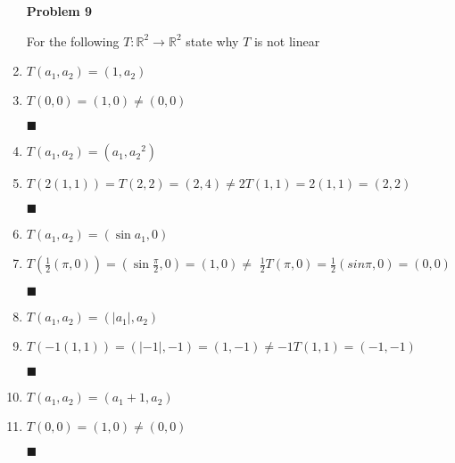 \documentclass[a4paper, 12pt]{report}
\newcommand{\bb}[1]{\mathbb{#1}}
\newcommand{\problem}[2]{
	\begin{enumerate}
		\item[\bf{Problem #1}] 
		#2
	\end{enumerate}
}
\newcommand{\subproof}[3]{
	\item[#1] #2
	\item[\bf{Proof:}]
	#3 
	\begin{flushright}
		$\blacksquare$
	\end{flushright}
}
\begin{document}

\problem{9}{
	For the following $T:\bb{R}^2 \rightarrow \bb{R}^2$ state why $T$ is not linear

	\subproof{(a)}{
		$T(a_1,a_2) = (1,a_2)$	
	}{
		$T(0,0) = (1,0) \ne (0,0)$
	}
	\subproof{(b)}{
		$T(a_1,a_2) = (a_1,{a_2}^2)$	
	}{
		$T(2(1,1)) = T(2,2) = (2,4) \ne 2T(1,1) = 2(1,1) = (2,2)$
	}
	\subproof{(c)}{
		$T(a_1,a_2) = (\sin a_1,0)$	
	}{
		$T(\frac{1}{2}(\pi,0)) = (\sin \frac{\pi}{2}, 0) = (1,0) \ne$
		$\frac{1}{2}T(\pi,0) = \frac{1}{2}(sin \pi, 0) = (0,0)$
	}
	\subproof{(d)}{
		$T(a_1,a_2) = (|a_1|,a_2)$	
	}{
		$T(-1(1,1)) = (|-1|,-1) = (1,-1) \ne -1T(1,1) = (-1,-1)$
	}
	\subproof{(e)}{
		$T(a_1,a_2) = (a_1 + 1,a_2)$	
	}{
		$T(0,0) = (1,0) \ne (0,0)$
	}
}
\end{document}
